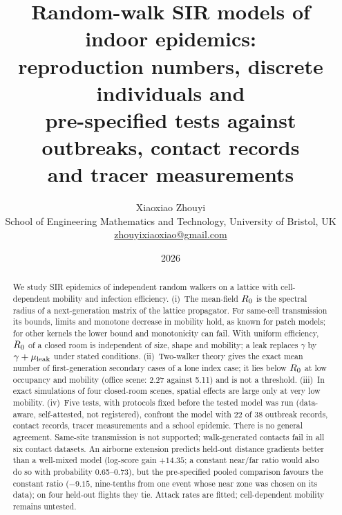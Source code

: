 \documentclass[11pt,a4paper]{article}
\title{Random-walk SIR models of indoor epidemics:\\ reproduction numbers, discrete individuals and\\
pre-specified tests against outbreaks, contact records\\ and tracer measurements}
\author{Xiaoxiao Zhouyi\\[4pt]
\normalsize School of Engineering Mathematics and Technology, University of Bristol, UK\\
\normalsize \href{mailto:zhouyixiaoxiao@gmail.com}{zhouyixiaoxiao@gmail.com}}
\date{\vspace{-1.5ex}2026\vspace{-2ex}}
\begin{document}
\maketitle

\begin{abstract}
We study SIR epidemics of independent random walkers on a lattice with cell-dependent mobility and
infection efficiency. (i)~The mean-field $R_0$ is the spectral radius of a next-generation matrix of
the lattice propagator. For same-cell transmission its bounds, limits and monotone decrease in mobility hold, as
known for patch models; for other kernels the lower bound and monotonicity can fail. With uniform efficiency,
$R_0$ of a closed room is independent of size, shape and mobility; a leak replaces $\gamma$ by $\gamma+\mu_{\mathrm{leak}}$
under stated conditions.
(ii)~Two-walker theory gives the exact mean number of first-generation secondary cases of a lone index case;
it lies below $R_0$ at low occupancy and mobility (office scene: 2.27 against 5.11) and is not a threshold.
(iii)~In exact simulations of four closed-room scenes, spatial effects are large only at very low mobility.
(iv)~Five tests, with protocols fixed before the tested model was run (data-aware,
self-attested, not registered), confront the model with 22 of 38 outbreak records, contact records, tracer
measurements and a school epidemic. There is no general agreement. Same-site transmission is not supported;
walk-generated contacts fail in all six contact datasets. An airborne extension predicts held-out distance
gradients better than a well-mixed model (log-score gain $+14.35$; a constant near/far ratio would also do so with
probability 0.65--0.73), but the pre-specified pooled
comparison favours the constant ratio ($-9.15$, nine-tenths from one event whose near zone was chosen on its data); on four held-out flights they tie. Attack rates are fitted; cell-dependent mobility
remains untested.
\end{abstract}
\end{document}
